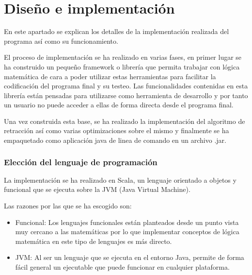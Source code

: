 \chapter*{Diseño e implementación}
	
	En este apartado se explican los detalles de la implementación realizada del programa así como su funcionamiento.
	
	El proceso de implementación se ha realizado en varias fases, en primer lugar se ha construido un pequeño framework o librería que permita trabajar con lógica matemática de cara a poder utilizar estas herramientas para facilitar la codificación del programa final y su testeo. Las funcionalidades contenidas en esta librería están pensadas para utilizarse como herramienta de desarrollo y por tanto un usuario no puede acceder a ellas de forma directa desde el programa final.
	
	Una vez construida esta base, se ha realizado la implementación del algoritmo de retracción así como varias optimizaciones sobre el mismo y finalmente se ha empaquetado como aplicación java de linea de comando en un archivo .jar.

\subsection*{Elección del lenguaje de programación}
	
	
	La implementación se ha realizado en Scala, un lenguaje orientado a objetos y funcional que se ejecuta sobre la JVM (Java Virtual Machine).
	
	Las razones por las que se ha escogido son:
	
	\begin{itemize}
		
		\item Funcional: Los lenguajes funcionales están planteados desde un punto vista muy cercano a las matemáticas por lo que implementar
		conceptos de lógica matemática en este tipo de lenguajes es más directo.
		
		\item JVM: Al ser un lenguaje que se ejecuta en el entorno Java, permite de forma fácil general un ejecutable que puede funcionar en cualquier plataforma.
		
	\end{itemize}




